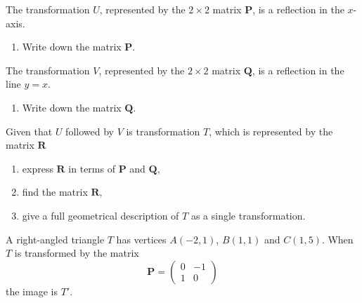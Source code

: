 \documentclass[leqno]{article}
\begin{document}
\djsFrontMatter
\begin{enumerate}[
  label=\textbf{\arabic*.},
  leftmargin=*,
  topsep=0pt,
  partopsep=0pt,
  parsep=0pt
]

\questionitem

The transformation $U$, represented by the $2\times 2$ matrix $\mathbf{P}$, is a reflection in the $x$-axis. \\

\begin{enumerate}[label=\textbf{(\alph*)}]
  \item Write down the matrix $\mathbf{P}$.  \\
\end{enumerate}

The transformation $V$, represented by the $2\times 2$ matrix $\mathbf{Q}$, is a reflection in the line $y=x$. \\

\begin{enumerate}[label=\textbf{(\alph*)}, resume]
  \item Write down the matrix $\mathbf{Q}$.  \\
\end{enumerate}

Given that $U$ followed by $V$ is transformation $T$, which is represented by the matrix $\mathbf{R}$ \\

\begin{enumerate}[label=\textbf{(\alph*)}, resume]
  \item express $\mathbf{R}$ in terms of $\mathbf{P}$ and $\mathbf{Q}$, 
  \item find the matrix $\mathbf{R}$, 
  \item give a full geometrical description of $T$ as a single transformation.  \\
\end{enumerate}

\newpage

\questionitem

A right-angled triangle $T$ has vertices $A(-2,1)$, $B(1,1)$ and $C(1,5)$. When $T$ is transformed by the matrix
\[
\mathbf{P} = \begin{pmatrix} 0 & -1 \\ 1 & 0 \end{pmatrix}
\]
the image is $T'$. \\


\end{enumerate}
\end{document}
